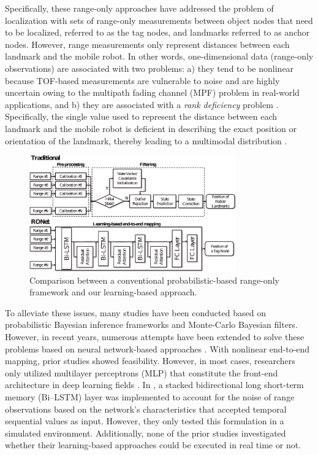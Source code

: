 \documentclass[letterpaper, 10 pt, conference]{ieeeconf}
\begin{document}
Specifically, these range-only approaches have addressed the problem of localization with sets of range-only measurements between object nodes that need to be localized, referred to as the tag nodes, and landmarks referred to as anchor nodes. However, range measurements only represent distances between each landmark and the mobile robot. In other words, one-dimensional data (range-only observations) are associated with two problems: a) they tend to be nonlinear because TOF-based measurements are vulnerable to noise and are highly uncertain owing to the multipath fading channel (MPF) problem \cite{li2017novel} in real-world applications, and b) they are associated with a \textit{rank deficiency} problem \cite{fabresse2018efficient}. Specifically, the single value used to represent the distance between each landmark and the mobile robot is deficient in describing the exact position or orientation of the landmark, thereby leading to a multimodal distribution \cite{gonzalez2009mobile}. 

\begin{figure}[h]	
	\centering
	\includegraphics[height=5cm]{image/conventional_deep_v2}
	
	\label{fig:overview}
	
	\caption{Comparison between a conventional probabilistic-based range-only framework and our learning-based approach.}
	
\end{figure}

To alleviate these issues, many studies have been conducted based on probabilistic Bayesian inference frameworks and Monte-Carlo Bayesian filters. However, in recent years, numerous attempts have been extended to solve these problems based on neural network-based approaches \cite{rahman2009localization, abdelhadi2013efficient, kumar2016localization, lim2018effective}. With nonlinear end-to-end mapping, prior studies showed feasibility. However, in most cases, researchers only utilized multilayer perceptrons (MLP) that constitute the front-end architecture in deep learning fields \cite{rahman2009localization, abdelhadi2013efficient, kumar2016localization}. In \cite{lim2018effective}, a stacked bidirectional long short-term memory (Bi--LSTM) layer was implemented to account for the noise of range observations based on the network’s characteristics that accepted temporal sequential values as input. However, they only tested this formulation in a simulated environment\cite{rahman2009localization, abdelhadi2013efficient, kumar2016localization}. Additionally, none of the prior studies investigated whether their learning-based approaches could be executed in real time or not. 
\end{document}
